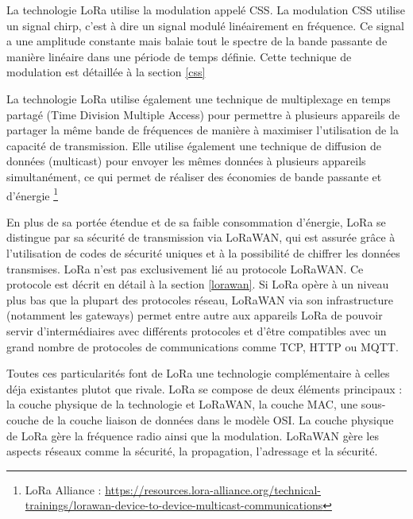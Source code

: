 \vspace{0.1cm}

La technologie LoRa utilise la modulation appelé \ac{CSS}. La modulation \ac{CSS} utilise un signal chirp, c'est à dire un signal modulé linéairement en fréquence. Ce signal a une amplitude constante mais balaie tout le spectre de la bande passante de manière linéaire dans une période de temps définie. Cette technique de modulation est détaillée à la section \ref{css}

\vspace{0.1cm}

La technologie \ac{LoRa} utilise également une technique de multiplexage en temps partagé (Time Division Multiple Access) pour permettre à plusieurs appareils de partager la même bande de fréquences de manière à maximiser l'utilisation de la capacité de transmission. Elle utilise également une technique de diffusion de données (multicast) pour envoyer les mêmes données à plusieurs appareils simultanément, ce qui permet de réaliser des économies de bande passante et d'énergie \footnote{LoRa Alliance : \href{https://resources.lora-alliance.org/technical-trainings/lorawan-device-to-device-multicast-communications}{https://resources.lora-alliance.org/technical-trainings/lorawan-device-to-device-multicast-communications}}

\vspace{0.1cm}

En plus de sa portée étendue et de sa faible consommation d'énergie, LoRa se distingue par sa sécurité de transmission via LoRaWAN, qui est assurée grâce à l'utilisation de codes de sécurité uniques et à la possibilité de chiffrer les données transmises. \ac{LoRa} n'est pas exclusivement lié au protocole LoRaWAN. Ce protocole est décrit en détail à la section \ref{lorawan}. Si \ac{LoRa} opère à un niveau plus bas que la plupart des protocoles réseau, LoRaWAN via son infrastructure (notamment les gateways) permet entre autre aux appareils LoRa de pouvoir servir d'intermédiaires avec différents protocoles et d'être compatibles avec un grand nombre de protocoles de communications comme \ac{TCP}, \ac{HTTP} ou \ac{MQTT}.

\vspace{0.1cm}

Toutes ces  particularités font de \ac{LoRa} une technologie complémentaire à celles déja existantes plutot que rivale.
\ac{LoRa} se compose de deux éléments principaux : la couche physique de la technologie et LoRaWAN, la couche \ac{MAC}, une sous-couche de la couche liaison de données dans le modèle \ac{OSI}. La couche physique de \ac{LoRa} gère la fréquence radio ainsi que la modulation. LoRaWAN gère les aspects réseaux comme la sécurité, la propagation, l'adressage et la sécurité.

